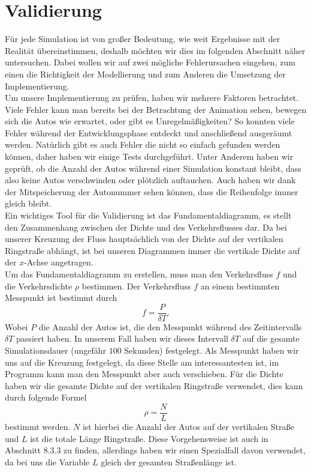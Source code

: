 \chapter{Validierung}

Für jede Simulation ist von großer Bedeutung, wie weit Ergebnisse mit der Realität übereinstimmen, deshalb möchten wir dies im folgenden Abschnitt näher untersuchen. Dabei wollen wir auf zwei mögliche Fehlerursachen eingehen, zum einen die Richtigkeit der Modellierung und zum Anderen die Umsetzung der Implementierung. \\

Um unsere Implementierung zu prüfen, haben wir mehrere Faktoren betrachtet. Viele Fehler kann man bereits bei der Betrachtung der Animation sehen, bewegen sich die Autos wie erwartet, oder gibt es Unregelmäßigkeiten? So konnten viele Fehler während der Entwicklungsphase entdeckt und anschließend ausgeräumt werden. Natürlich gibt es auch Fehler die nicht so einfach gefunden werden können, daher haben wir einige Tests durchgeführt. Unter Anderem haben wir geprüft, ob die Anzahl der Autos während einer Simulation konstant bleibt, dass also keine Autos verschwinden oder plötzlich auftauchen. Auch haben wir dank der Mitspeicherung der Autonummer sehen können, dass die Reihenfolge immer gleich bleibt. \\

Ein wichtiges Tool für die Validierung ist das Fundamentaldiagramm, es stellt den Zusammenhang zwischen der Dichte und des Verkehrsflusses dar. Da bei unserer Kreuzung der Fluss hauptsächlich von der Dichte auf der vertikalen Ringstraße abhängt, ist bei unseren Diagrammen immer die vertikale Dichte auf der $x$-Achse angetragen. \\

Um das Fundamentaldiagramm zu erstellen, muss man den Verkehrsfluss $f$ und die Verkehrsdichte $\rho$ bestimmen. Der Verkehrsfluss $f$ an einem bestimmten Messpunkt ist bestimmt durch
\[ f = \frac{P}{\delta T}. \]
Wobei $P$ die Anzahl der Autos ist, die den Messpunkt während des Zeitintervalls $\delta T$ passiert haben. In unserem Fall haben wir dieses Intervall $\delta T$ auf die gesamte Simulationsdauer (ungefähr $100$ Sekunden) festgelegt. Als Messpunkt haben wir uns auf die Kreuzung festgelegt, da diese Stelle am interessantesten ist, im Programm kann man den Messpunkt aber auch verschieben. Für die Dichte haben wir die gesamte Dichte auf der vertikalen Ringstraße verwendet, dies kann durch folgende Formel
\[ \rho = \frac{N}{L} \]
bestimmt werden. $N$ ist hierbei die Anzahl der Autos auf der vertikalen Straße und $L$ ist die totale Länge Ringstraße. Diese Vorgehensweise ist auch in \cite{book:bungartz} Abschnitt 8.3.3 zu finden, allerdings haben wir einen Spezialfall davon verwendet, da bei uns die Variable $L$ gleich der gesamten Straßenlänge ist.

